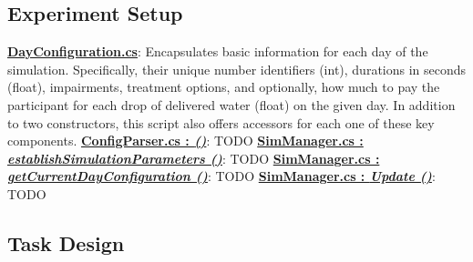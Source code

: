 \documentclass{article}
\begin{document}
\subsection*{Experiment Setup} %
\href{https://bit.ly/2FvRTWR}{\textbf{DayConfiguration.cs}}: Encapsulates basic information for each day of the simulation. Specifically, their unique number identifiers (int), durations in seconds (float), impairments, treatment options, and optionally, how much to pay the participant for each drop of delivered water (float) on the given day. In addition to two constructors, this script also offers accessors for each one of these key components. \newline \newline
\href{https://bit.ly/2TZaLYj}{\textbf{ConfigParser.cs : \textit{ ()}}}: TODO \newline \newline
\href{https://bit.ly/2UhmSzq}{\textbf{SimManager.cs : \textit{establishSimulationParameters ()}}}: TODO \newline \newline
\href{https://bit.ly/2UhmSzq}{\textbf{SimManager.cs : \textit{getCurrentDayConfiguration ()}}}: TODO \newline \newline
\href{https://bit.ly/2UhmSzq}{\textbf{SimManager.cs : \textit{Update ()}}}: TODO 

\subsection*{Task Design}
\end{document}
